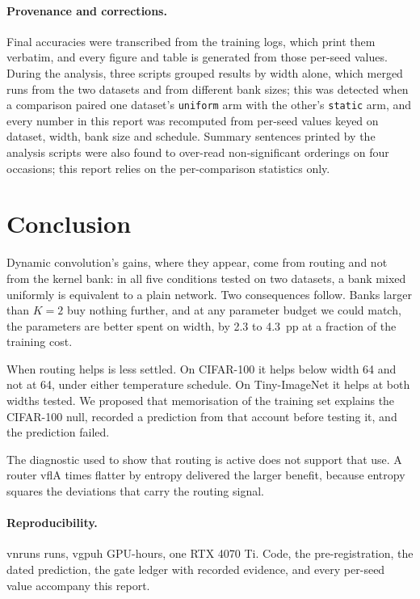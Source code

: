 \documentclass[10pt,a4paper]{article}
\newcommand{\V}[1]{\csname v#1\endcsname}
\begin{document}
\paragraph{Provenance and corrections.} Final accuracies were transcribed
from the training logs, which print them verbatim, and every figure and
table is generated from those per-seed values. During the analysis, three
scripts grouped results by width alone, which merged runs from the two
datasets and from different bank sizes; this was detected when a
comparison paired one dataset's \texttt{uniform} arm with the other's
\texttt{static} arm, and every number in this report was recomputed from
per-seed values keyed on dataset, width, bank size and schedule. Summary
sentences printed by the analysis scripts were also found to over-read
non-significant orderings on four occasions; this report relies on the
per-comparison statistics only.

\section{Conclusion}

Dynamic convolution's gains, where they appear, come from routing and not
from the kernel bank: in all five conditions tested on two datasets, a
bank mixed uniformly is equivalent to a plain network. Two consequences
follow. Banks larger than $K=2$ buy nothing further, and at any
parameter budget we could match, the parameters are better spent on
width, by 2.3 to \SI{4.3}{pp} at a fraction of the training cost.

When routing helps is less settled. On CIFAR-100 it helps below width 64
and not at 64, under either temperature schedule. On Tiny-ImageNet it
helps at both widths tested. We proposed that memorisation of the
training set explains the CIFAR-100 null, recorded a prediction from that
account before testing it, and the prediction failed.

The diagnostic used to show that routing is active does not support that
use. A router \V{flA} times flatter by entropy delivered the larger
benefit, because entropy squares the deviations that carry the routing
signal.

\paragraph{Reproducibility.} \V{nruns} runs, \V{gpuh} GPU-hours, one RTX
4070 Ti. Code, the pre-registration, the dated prediction, the gate
ledger with recorded evidence, and every per-seed value accompany this
report.
\end{document}
